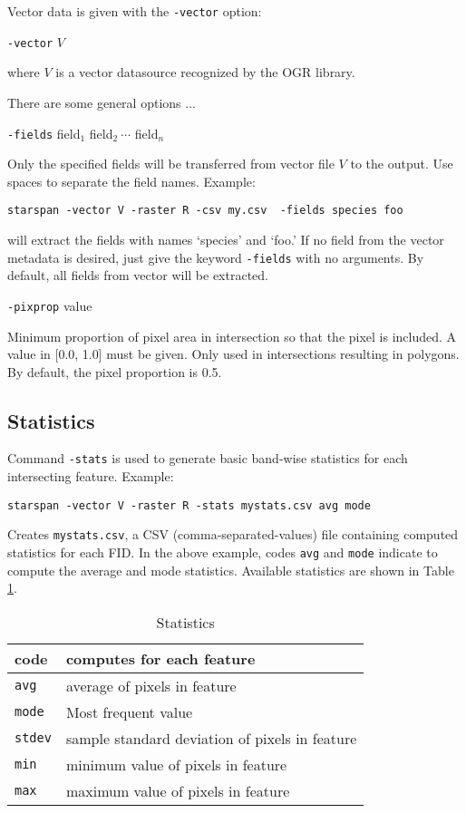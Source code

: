 \documentclass{elsart}
\begin{document}
Vector data is given with the \verb|-vector| option:
	
	\verb|-vector| $V$

where $V$ is a vector datasource recognized by the OGR library.

There are some general options ...

	\verb|-fields| field$_1$ field$_2\ \cdots$ field$_n$
	
Only the specified fields will be transferred from vector file $V$
to the output. Use spaces to separate the field names.  Example:

   \verb|starspan -vector V -raster R -csv my.csv  -fields species foo|

will extract the fields with names `species' and `foo.' If no field from the
vector metadata is desired, just give the keyword \verb|-fields| with no
arguments. By default, all fields from vector will be extracted.

	\verb|-pixprop| value

Minimum proportion of pixel area in intersection so that the pixel is included.
A value in [0.0, 1.0] must be given.
Only used in intersections resulting in polygons. 
By default, the pixel proportion is 0.5. 



\subsection{Statistics}

Command \verb|-stats| is used to generate basic band-wise statistics for each
intersecting feature. Example:

	\verb|starspan -vector V -raster R -stats mystats.csv avg mode|

Creates \verb|mystats.csv|, a CSV (comma-separated-values) file containing
computed statistics for each FID. In the above example, codes \verb|avg| and
\verb|mode|
indicate to compute the average and mode statistics. Available statistics 
are shown in Table \ref{table-stats}.
\begin{table}[!ht]
\centering
\caption{Statistics}
\begin{tabular}{|l|l|}
\hline 
  code        & computes for each feature\\
\hline
\verb|avg  |  &   average of pixels in feature\\
\verb|mode |  &   Most frequent value\\
\verb|stdev|  &   sample standard deviation of pixels in feature\\
\verb|min  |  &   minimum value of pixels in feature\\
\verb|max  |  &   maximum value of pixels in feature\\
\hline
\end{tabular}
\label{table-stats}
\end{table}
\end{document}
